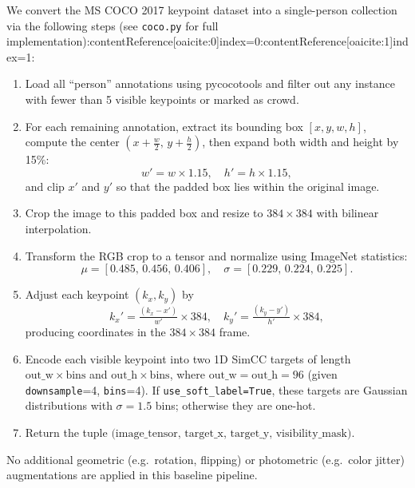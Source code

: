 We convert the MS COCO 2017 keypoint dataset into a single-person collection via the following steps (see \texttt{coco.py} for full implementation):contentReference[oaicite:0]{index=0}:contentReference[oaicite:1]{index=1}:
\begin{enumerate}
  \item Load all “person” annotations using pycocotools and filter out any instance with fewer than 5 visible keypoints or marked as crowd.
  \item For each remaining annotation, extract its bounding box $[x,y,w,h]$, compute the center $(x+\tfrac{w}{2},\,y+\tfrac{h}{2})$, then expand both width and height by 15\%:
    \[
      w' = w\times1.15,\quad h' = h\times1.15,
    \]
    and clip $x'$ and $y'$ so that the padded box lies within the original image.
  \item Crop the image to this padded box and resize to $384\times384$ with bilinear interpolation.
  \item Transform the RGB crop to a tensor and normalize using ImageNet statistics:
    \[
      \mu = [0.485,\,0.456,\,0.406],\quad
      \sigma = [0.229,\,0.224,\,0.225].
    \]
  \item Adjust each keypoint $(k_x,k_y)$ by
    \[
      k_x' = \tfrac{(k_x - x')}{w'}\times384,\quad
      k_y' = \tfrac{(k_y - y')}{h'}\times384,
    \]
    producing coordinates in the $384\times384$ frame.
  \item Encode each visible keypoint into two 1D SimCC targets of length
    \(\mathrm{out\_w}\times\mathrm{bins}\) and \(\mathrm{out\_h}\times\mathrm{bins}\), where
    \(\mathrm{out\_w}=\mathrm{out\_h}=96\) (given \texttt{downsample}=4, \texttt{bins}=4).
    If \texttt{use\_soft\_label=True}, these targets are Gaussian distributions with \(\sigma=1.5\) bins; otherwise they are one-hot.
  \item Return the tuple
    \(\bigl(\text{image\_tensor},\,\text{target\_x},\,\text{target\_y},\,\text{visibility\_mask}\bigr)\).
\end{enumerate}

No additional geometric (e.g.\ rotation, flipping) or photometric (e.g.\ color jitter) augmentations are applied in this baseline pipeline.
